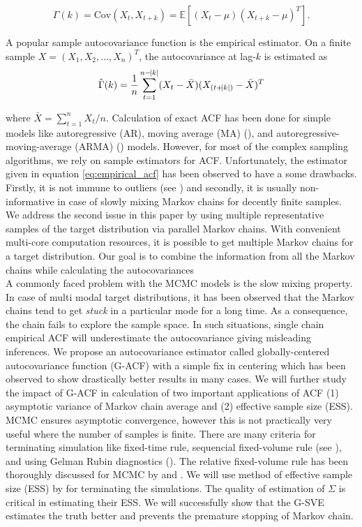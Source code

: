 \documentclass[11pt]{article}
\newcommand{\Cov}{\text{Cov}}
\theoremstyle{remark}
\begin{document}
\[
    \Gamma(k) = \Cov(X_t, X_{t+k}) = \mathbb{E}[(X_t - \mu)(X_{t+k} - \mu)^T].
\]

A popular sample autocovariance function is the empirical estimator. On a finite sample $X = (X_1, X_2, ..., X_n)^T$, the autocovariance at lag-$k$ is estimated as
%
\begin{equation} \label{eq:empirical_acf}
    \hat{\Gamma}(k) = \dfrac{1}{n}\sum_{t=1}^{n-\abs{k}}(X_t - \bar{X})(X_{(t+\abs{k})} - \bar{X})^T
\end{equation}


where $\bar{X} = \sum_{t=1}^nX_t/n$. Calculation of exact ACF has been done for simple models like autoregressive (AR), moving average (MA) (\cite{quenouille1947notes}), and autoregressive-moving-average (ARMA) (\cite{box2015time}) models. However, for most of the complex sampling algorithms, we rely on sample estimators for ACF. Unfortunately, the estimator given in equation \ref{eq:empirical_acf} has been observed to have a some drawbacks. Firstly, it is not immune to outliers (see \cite{ma2000highly}) and secondly, it is usually non-informative in case of slowly mixing Markov chains for decently finite samples. We address the second issue in this paper by using multiple representative samples of the target distribution via parallel Markov chains. With convenient multi-core computation resources, it is possible to get multiple Markov chains for a target distribution. Our goal is to combine the information from all the Markov chains while calculating the autocovariances\\

 A commonly faced problem with the MCMC models is the slow mixing property. In case of multi modal target distributions, it has been observed that the Markov chains tend to get \textit{stuck} in a particular mode for a long time. As a consequence, the chain fails to explore the sample space. In such situations, single chain empirical ACF will underestimate the autocovariance giving misleading inferences.  We propose an autocovariance estimator called globally-centered autocovariance function (G-ACF) with a simple fix in centering which has been observed to show drastically better results in many cases. We will further study the impact of G-ACF in calculation of two important applications of ACF (1) asymptotic variance of Markov chain average and (2) effective sample size (ESS).\\
 

 MCMC ensures asymptotic convergence, however this is not practically very useful where the number of samples is finite. There are many criteria for terminating simulation like fixed-time rule, sequencial fixed-volume rule (see \cite{glynn1992asymptotic}), and using Gelman Rubin diagnostics (\cite{gelman1992inference}). The relative fixed-volume rule has been thoroughly discussed for MCMC by \cite{flegal2015relative} and \cite{gong2016practical}. We will use method of effective sample size (ESS) by \cite{vats2019multivariate} for terminating the simulations. The quality of estimation of $\Sigma$ is critical in estimating their ESS. We will successfully show that the G-SVE estimates the truth better and prevents the premature stopping of Markov chain.\\
\end{document}

